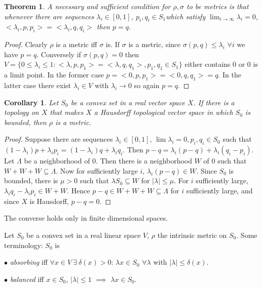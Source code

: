 \documentclass[12pt,letterpaper]{article}
\newtheorem{corollary}[lemma]{Corollary}
\newtheorem{theorem}[lemma]{Theorem}
\begin{document}
\begin{theorem}\label{th:metric}  A necessary and sufficient condition for $\rho, \sigma$ to be metrics is that whenever there are sequences $\lambda_i\in [0,1]$, $p_i,q_i\in S_1$which satisfy $\lim_{i\to\infty} \lambda_i=0$, $<\lambda_i,p,p_i>=<\lambda_i,q,q_i>$ then $p=q$.
\end{theorem}

\begin{proof} Clearly $\rho$ is a metric iff $\sigma$ is. If $\sigma$ is a metric, since $\sigma(p,q)\leq \lambda_i$ $\forall i$ we have $p=q$. Conversely if $\sigma(p,q)=0$ then $V=\{ 0\leq \lambda_i\leq 1:<\lambda,p,p_1>=<\lambda,q,q_1>, p_1,q_1\in S_1\}$ either contains $0$ or $0$ is a limit point. In the former case $p=<0,p,p_1>=<0,q,q_1>=q$. In the latter case there exist $\lambda_i\in V$ with $\lambda_i \to 0$ so again $p=q$.
\end{proof}

\begin{corollary}\label{co:metric} Let $S_0$ be a convex set in a real vector space $X$. If there is a topology on $X$ that makes $X$ a Hausdorff topological vector space
in which $S_0$ is bounded, then $\rho$ is a metric.
\end{corollary}

\begin{proof} Suppose there are sequences $\lambda_i\in [0,1]$, $\lim \lambda_i=0, p_i,q_i\in S_0$ such that $(1-\lambda_i)p+\lambda_ip_i=(1-\lambda_i)q+\lambda_iq_i$. Then $p-q=\lambda_i(p-q)+\lambda_i(q_i-p_i)$. Let $\Lambda$ be a neighborhood of $0$. Then there is a neighborhood $W$ of $0$ such that $W+W+W\subseteq \Lambda$. Now for sufficiently large $i$, $\lambda_i(p-q)\in W$. Since $S_0$ is bounded, there is $\mu >0$ such that $\lambda S_0\subseteq W$ for $|\lambda|\leq \mu$. For $i$ sufficiently large, $\lambda_iq_i-\lambda_ip_i\in W+W$. Hence $p-q\in W+W+W\subseteq \Lambda$ for $i$ sufficiently large, and since $X$ is Hausdorff, $p-q=0$.
\end{proof}


The converse holds only in finite dimensional spaces.

Let $S_0$ be a convex set in a real linear space $V$, $\rho$ the intrinsic metric on $S_0$. Some terminology: $S_0$  is


$\bullet$  \emph{absorbing} iff  $\forall x\in V \ \exists\  \delta(x)>0$: $\lambda x\in S_0$ $\forall \lambda$ with $|\lambda|\leq \delta(x)$.

$\bullet$  \emph{balanced} iff $x\in S_0$, $|\lambda |\leq 1$ $\implies$ $\lambda x\in S_0$.
\end{document}
